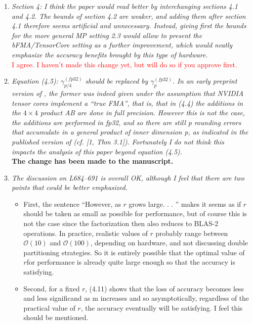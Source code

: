 \documentclass[final,onefignum,onetabnum]{siamart190516}
\newcommand{\cO}{\mathcal{O}}
\newcommand{\red}[1]{\textcolor{red}{#1}}
\begin{document}
\begin{enumerate}
    \item {\it Section 4: I think the paper would read better by interchanging sections 4.1 and 4.2. The bounds of section 4.2 are weaker, and adding them after section 4.1 therefore seems artificial and unnecessary. Instead, giving first the bounds for the more general MP setting 2.3 would allow to present the bFMA/TensorCore setting as a further improvement, which would neatly emphasize the accuracy benefits brought by this type of hardware.}\\
    \red{I agree. I haven't made this change yet, but will do so if you approve first.}
    \item {\it Equation (4.5): $\gamma_{p/4}^{(fp32)}$ should be replaced by $\gamma_p^{(fp32)}$. In an early preprint version of \cite{Blanchard2020}, the former was indeed given under the assumption that NVIDIA tensor cores implement a “true FMA”, that is, that in (4.4) the additions in the $4\times 4$ product AB are done in full precision. However this is not the case, the additions are performed in fp32, and so there are still p rounding errors that accumulate in a general product of inner dimension p, as indicated in the published version of \cite{Blanchard2020} (cf. [1, Thm 3.1]). Fortunately I do not think this impacts the analysis of this paper beyond equation (4.5).}\\
    {\bf The change has been made to the manuscript.}
    \item {\it The discussion on L684–691 is overall OK, although I feel that there are two points that could be better emphasized.}
    \begin{itemize}
        \item First, the sentence “However, as $r$ grows large. . . ” makes it seems as if $r$ should be taken as small as possible for performance, but of course this is not the case since the factorization then also reduces to BLAS-2 operations. In practice, realistic values of $r$ probably range between $\cO(10)$ and $\cO(100)$, depending on hardware, and not discussing double partitioning strategies. So it is entirely possible that the optimal value of $r$for performance is already quite large enough so that the accuracy is satisfying.
        \item Second, for a fixed $r$, (4.11) shows that the loss of accuracy becomes less and less significand as m increases and so asymptotically, regardless of the practical value of $r$, the accuracy eventually will be satisfying. I feel this should be mentioned.
\end{itemize}

\end{enumerate}
\end{document}
